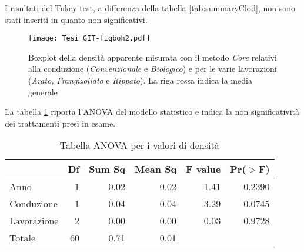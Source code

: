 \documentclass[a4paper]{article}
\begin{document}
I risultati del  Tukey test, a differenza della tabella \ref{tab:summaryClod}, non sono stati inseriti in
quanto non significativi.


\begin{figure}[hb]
  \centering
  \texttt{[image: Tesi\_GIT-figboh2.pdf]}

  \caption[Boxplot della densità apparente: metodo
  \emph{Core}]{Boxplot della densità apparente misurata con il metodo \emph{Core}
    relativi alla conduzione (\emph{Convenzionale} e \emph{Biologico}) e per le varie
    lavorazioni (\emph{Arato, Frangizollato} e \emph{Rippato}). La riga rossa indica
    la media generale}
  \label{fig:boxplotCore}
\end{figure}
\FloatBarrier




La tabella \ref{tab:anova_del_modello} riporta l'ANOVA del modello
statistico e indica la non significatività dei trattamenti presi in
esame.

\begin{table}[ht]
\centering
\caption{Tabella ANOVA per i valori di densità%
\label{tab:anova_del_modello}}
\begin{tabular}{lrrrrr}
  \hline
 & Df & Sum Sq & Mean Sq & F value & Pr($>$F) \\ 
  \hline
Anno & 1 & 0.02 & 0.02 & 1.41 & 0.2390 \\ 
  Conduzione & 1 & 0.04 & 0.04 & 3.29 & 0.0745 \\ 
  Lavorazione & 2 & 0.00 & 0.00 & 0.03 & 0.9728 \\ 
  Totale & 60 & 0.71 & 0.01 &  &  \\ 
   \hline
\end{tabular}
\end{table}\FloatBarrier

\end{document}
